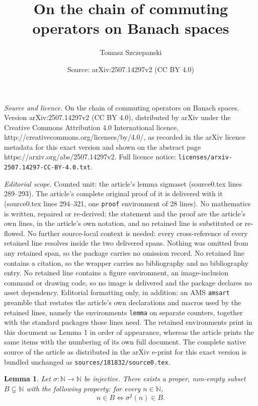 \documentclass[10pt,a4paper]{amsart}
\title{On the chain of commuting operators on Banach spaces}
\author{Tomasz Szczepanski}
\date{Source: arXiv:2507.14297v2 (CC BY 4.0)}
\newtheorem{lemma}{Lemma}
\newcommand{\N}{\mathbb{N}}
\begin{document}
\maketitle

\noindent\emph{Source and licence.} On the chain of commuting operators on Banach spaces. Version arXiv:2507.14297v2 (CC BY 4.0), distributed by arXiv under the Creative Commons Attribution 4.0 International licence, http://creativecommons.org/licenses/by/4.0/, as recorded in the arXiv licence metadata for this exact version and shown on the abstract page https://arxiv.org/abs/2507.14297v2. Full licence notice: \texttt{licenses/arxiv-2507.14297-CC-BY-4.0.txt}.\par\smallskip

\noindent\textit{Editorial scope.} Counted unit: the article's lemma sigmaset (source0.tex lines 289--293). The article's complete original proof of it is delivered with it (source0.tex lines 294--321, one \texttt{proof} environment of 28 lines). No mathematics is written, repaired or re-derived: the statement and the proof are the article's own lines, in the article's own notation, and no retained line is substituted or re-flowed.  No further source-local context is needed: every cross-reference of every retained line resolves inside the two delivered spans.  Nothing was omitted from any retained span, so the package carries no omission record.  No retained line contains a citation, so the wrapper carries no bibliography and no bibliography entry.  No retained line contains a figure environment, an image-inclusion command or drawing code, so no image is delivered and the package declares no asset dependency.  Editorial formatting only, in addition: an AMS \texttt{amsart} preamble that restates the article's own declarations and macros used by the retained lines, namely the environments \texttt{lemma} on separate counters, together with the standard packages those lines need.  The retained environments print in this document as Lemma 1 in order of appearance, whereas the article prints the same items with the numbering of its own full document.  The complete native source of the article as distributed in the arXiv e-print for this exact version is bundled unchanged as \texttt{sources/181832/source0.tex}.
\begin{lemma}
\label{sigmaset}
Let $\sigma:\N \rightarrow \N$ be injective. There exists a proper, non-empty subset $B \subsetneq \N$ with the following property: for every $n\in \N$,
$$n \in B \iff \sigma^2(n)\in B.$$ 
\end{lemma}
\end{document}
